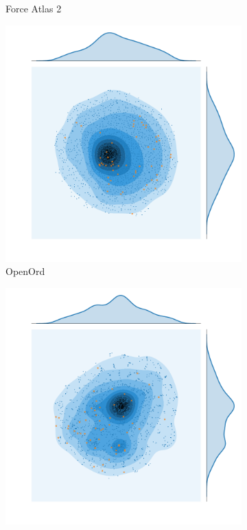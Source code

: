 \begin{figure}[H]
\begin{subfigure}[b]{.49\textwidth}
         \caption{Force Atlas 2}
         \label{fig:fa}
     \end{subfigure}
    \begin{subfigure}[b]{.49\textwidth}
         \centering \includegraphics[width=\textwidth,angle=-180]{figures_c1/layout/oo_aphh.pdf}
         \caption{OpenOrd}
         \label{fig:oo}
     \end{subfigure}
         \begin{subfigure}[b]{.49\textwidth}
         \centering \includegraphics[width=\textwidth,angle=-90]{figures_c1/layout/tsnet_aphh.pdf}

\end{subfigure}
\end{figure}
